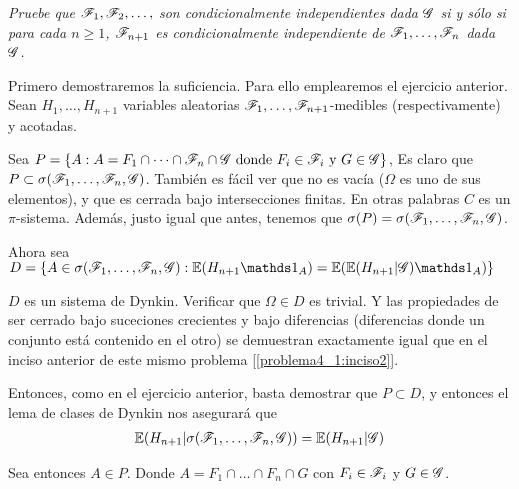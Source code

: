 \emph{
	Pruebe que $\mathscr{F}_1,\mathscr{F}_2,\ldots, $ son condicionalmente independientes dada 
	$\mathscr{G}$ si y s\'olo si para cada $n\geq 1$, $\mathscr{F}_{n+1}$ es condicionalmente 
	independiente de $\mathscr{F}_1,\ldots, \mathscr{F}_n$ dada $\mathscr{G}$. 
}

\afterstatement\par\null

Primero demostraremos la suficiencia. Para ello emplearemos el ejercicio anterior.
Sean $H_1, \dots, H_{n+1}$ variables aleatorias $\mathscr{F}_1, \dots, \mathscr{F}_{n+1}$-medibles (respectivamente) 
y acotadas.\par\null

Sea $P = \{ A : A = F_1 \cap \dots \cap \mathscr{F}_n \cap \mathscr{G} \text{ donde } F_i \in \mathscr{F}_i \text{ y } G \in \mathscr{G} \}$,
Es claro que $P \subset \sigma(\mathscr{F}_1, \dots, \mathscr{F}_n, \mathscr{G})$. También es fácil ver que no es vacía ($\Omega$ es uno de sus elementos), 
y que es cerrada bajo intersecciones finitas. En otras palabras $C$ es un $\pi$-sistema. Además, justo
igual que antes, tenemos que $\sigma(P) = \sigma(\mathscr{F}_1, \dots, \mathscr{F}_n, \mathscr{G})$.\par\null

Ahora sea $D = \{ A \in \sigma(\F_1, \dots, \F_n, \G) : \E(H_{n+1} \indic_A) = \E(\E(H_{n+1} | \G) \indic_A) \}$

$D$ es un sistema de Dynkin. Verificar que $\Omega \in D$ es trivial. Y las propiedades de ser cerrado bajo suceciones crecientes y 
bajo diferencias (diferencias donde un conjunto está contenido en el otro) se demuestran exactamente igual que en el inciso
anterior de este mismo problema [\ref{problema4_1:inciso2}].\par\null

Entonces, como en el ejercicio anterior, basta demostrar que $P \subset D$, y entonces el lema de clases
de Dynkin nos asegurará que 
\begin{align}
 \mathbb{E}(H_{n+1} | \sigma(\mathscr{F}_1, \dots, \mathscr{F}_n, \mathscr{G})) = \mathbb{E}(H_{n+1} | \mathscr{G})   \label{problema4_1:hipotesis_suficiencia_4_1_3}
\end{align}\par\null

Sea entonces $A \in P$. Donde $A = F_1 \cap \dots \cap F_n \cap G$ con $F_i \in \mathscr{F}_i$ y $G \in \mathscr{G}$.

